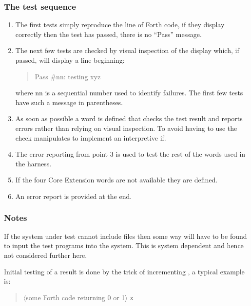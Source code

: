 \subsubsection{The test sequence}

\begin{enumerate}
\item The first tests simply reproduce the line of Forth code,
	if they display correctly then the test has passed, there
	is no ``Pass'' message.

\item The next few tests are checked by visual inspection of
	the display which, if passed, will display a line beginning:
	\begin{quote}
		Pass \#nn: testing xyz
	\end{quote}
	where nn is a sequential number used to identify failures.
	The first few tests have such a message in parentheses.

\item As soon as possible a word is defined that checks the test
	result and reports errors rather than relying on visual
	inspection. To avoid having to use  the check
	manipulates  to implement an interpretive if.

\item The error reporting from point 3 is used to test the rest
	of the words used in the harness.

\item If the four Core Extension words are not available they are defined.

\item An error report is provided at the end.
\end{enumerate}

\subsubsection{Notes}

If the system under test cannot include files then some way
will have to be found to input the test programs into the system.
This is system dependent and hence not considered further here.

Initial testing of a result is done by the trick of incrementing
, a typical example is:

\begin{quote} 
     $\langle$some Forth code returning 0 or 1$\rangle$
      \word{+!} \texttt{x} 
\end{quote}
 
